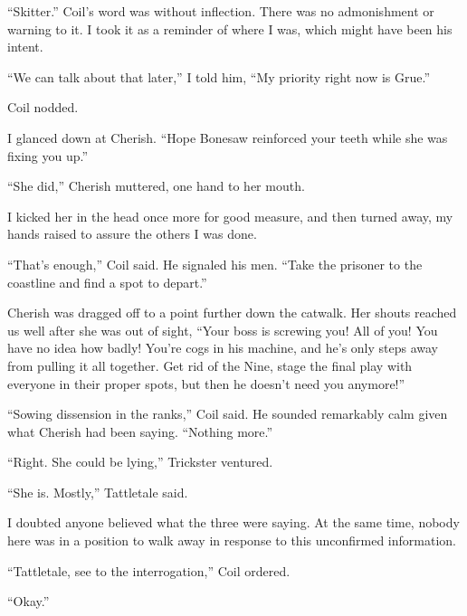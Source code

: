 ``Skitter.'' Coil's word was without inflection.  There was no admonishment or warning to it.  I took it as a reminder of where I was, which might have been his intent.



``We can talk about that later,'' I told him, ``My priority right now is Grue.''



Coil nodded.



I glanced down at Cherish.  ``Hope Bonesaw reinforced your teeth while she was fixing you up.''



``She did,'' Cherish muttered, one hand to her mouth.



I kicked her in the head once more for good measure, and then turned away, my hands raised to assure the others I was done.



``That's enough,'' Coil said.  He signaled his men.  ``Take the prisoner to the coastline and find a spot to depart.''



Cherish was dragged off to a point further down the catwalk.  Her shouts reached us well after she was out of sight, ``Your boss is screwing you!  All of you!  You have no idea how badly!  You're cogs in his machine, and he's only steps away from pulling it all together.  Get rid of the Nine, stage the final play with everyone in their proper spots, but then he doesn't need you anymore!''



``Sowing dissension in the ranks,'' Coil said.  He sounded remarkably calm given what Cherish had been saying.  ``Nothing more.''



``Right.  She could be lying,'' Trickster ventured.



``She is.  Mostly,'' Tattletale said.



I doubted anyone believed what the three were saying.  At the same time, nobody here was in a position to walk away in response to this unconfirmed information.



``Tattletale, see to the interrogation,''  Coil ordered.



``Okay.''



